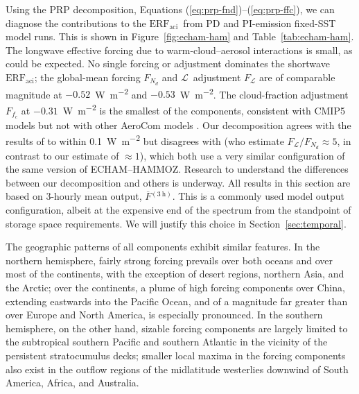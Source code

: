 \documentclass[acp, manuscript]{copernicus}\usepackage[]{graphicx}\usepackage[]{color}
\newcommand\nd{\ensuremath{N_d}}
\newcommand\lwp{\ensuremath{\mathcal L}}
\newcommand\fc{\ensuremath{f_c}}
\newcommand\erfaci{\ensuremath{\text{ERF}_\text{aci}}}
\begin{document}
Using the PRP decomposition, Equations (\ref{eq:prp-fnd})--(\ref{eq:prp-ffc}),
we can diagnose the contributions to the \erfaci\ from PD and PI-emission
fixed-SST model runs.  This is shown in Figure~\ref{fig:echam-ham} and
Table~\ref{tab:echam-ham}.  The longwave effective forcing due to
warm-cloud--aerosol interactions is small, as could be expected.  No single
forcing or adjustment dominates the shortwave \erfaci; the global-mean forcing
$F_{\nd}$ and \lwp\ adjustment $F_{\lwp}$ are of comparable magnitude at
$-0.52$~\unit{W~m^{-2}} and $-0.53$~\unit{W~m^{-2}}.  The cloud-fraction
adjustment $F_{\fc}$ at $-0.31$~\unit{W~m^{-2}} is the smallest of the
components, consistent with CMIP5 models but not with other AeroCom models
\citep{Zelinka2014,Ghan2016,Gryspeerdt2019b}.  Our decomposition agrees with the
results of \citet{Gryspeerdt2019b} to within 0.1~\unit{W~m^{-2}} but disagrees
with \citet{Ghan2016} (who estimate $F_{\lwp}/F_{\nd}\approx 5$, in contrast to
our estimate of $\approx 1$), which both use a very similar configuration of the
same version of ECHAM--HAMMOZ.  Research to understand the differences between our
decomposition and others is underway.  All results in this section are based on
3-hourly mean output, $\overline{F}{}^{(3~\text{h})}$. This is a commonly used
model output configuration, albeit at the expensive end of the spectrum from the
standpoint of storage space requirements.  We will justify this choice in
Section~\ref{sec:temporal}.

The geographic patterns of all components exhibit similar features.  In the
northern hemisphere, fairly strong forcing prevails over both oceans and over
most of the continents, with the exception of desert regions, northern Asia, and
the Arctic; over the continents, a plume of high forcing components over China,
extending eastwards into the Pacific Ocean, and of a magnitude far greater than
over Europe and North America, is especially pronounced.  In the southern
hemisphere, on the other hand, sizable forcing components are largely limited to
the subtropical southern Pacific and southern Atlantic in the vicinity of the
persistent stratocumulus decks; smaller local maxima in the forcing components
also exist in the outflow regions of the midlatitude westerlies downwind of
South America, Africa, and Australia.
\end{document}
